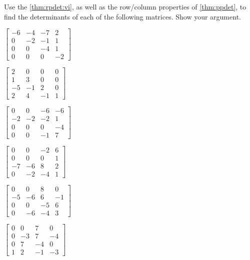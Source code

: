 \begin{exercise}  
Use the  \cref{thm:rpdet:vi}, as well as the row\slash column properties of \cref{thm:ppdet}, to find the determinants of each of the following matrices.
Show your argument.
\begin{Parts}
\item \(\begin{bmatrix} -6 & -4 & -7 & 2
\\0 & -2 & -1 & 1
\\0 & 0 & -4 & 1
\\0 & 0 & 0 & -2 \end{bmatrix}\)

\item \(\begin{bmatrix} 2 & 0 & 0 & 0
\\1 & 3 & 0 & 0
\\-5 & -1 & 2 & 0
\\2 & 4 & -1 & 1 \end{bmatrix}\)

\begin{reduce}
\item \(\begin{bmatrix} 0 & 0 & -6 & -6
\\-2 & -2 & -2 & 1
\\0 & 0 & 0 & -4
\\0 & 0 & -1 & 7 \end{bmatrix}\)

\item \(\begin{bmatrix} 0 & 0 & -2 & 6
\\0 & 0 & 0 & 1
\\-7 & -6 & 8 & 2
\\0 & -2 & -4 & 1 \end{bmatrix}\)
\end{reduce}

\item \(\begin{bmatrix} 0 & 0 & 8 & 0
\\-5 & -6 & 6 & -1
\\0 & 0 & -5 & 6
\\0 & -6 & -4 & 3 \end{bmatrix}\)

\item \(\begin{bmatrix} 0 & 0 & 7 & 0
\\0 & -3 & 7 & -4
\\0 & 7 & -4 & 0
\\1 & 2 & -1 & -3 \end{bmatrix}\)


\end{Parts}
\end{exercise}
